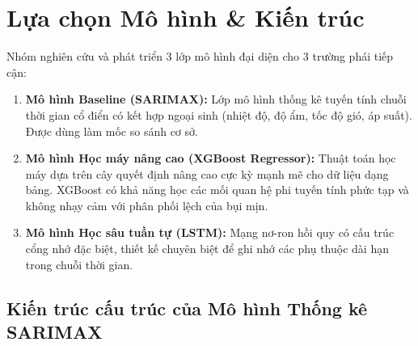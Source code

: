 \documentclass[12pt,a4paper]{article}
\begin{document}
\section{Lựa chọn Mô hình \& Kiến trúc}

Nhóm nghiên cứu và phát triển 3 lớp mô hình đại diện cho 3 trường phái tiếp cận:

\begin{enumerate}
    \item \textbf{Mô hình Baseline (SARIMAX):} Lớp mô hình thống kê tuyến tính chuỗi thời gian cổ điển có kết hợp ngoại sinh (nhiệt độ, độ ẩm, tốc độ gió, áp suất). Được dùng làm mốc so sánh cơ sở.
    \item \textbf{Mô hình Học máy nâng cao (XGBoost Regressor):} Thuật toán học máy dựa trên cây quyết định nâng cao cực kỳ mạnh mẽ cho dữ liệu dạng bảng. XGBoost có khả năng học các mối quan hệ phi tuyến tính phức tạp và không nhạy cảm với phân phối lệch của bụi mịn.
    \item \textbf{Mô hình Học sâu tuần tự (LSTM):} Mạng nơ-ron hồi quy có cấu trúc cổng nhớ đặc biệt, thiết kế chuyên biệt để ghi nhớ các phụ thuộc dài hạn trong chuỗi thời gian.
\end{enumerate}

\subsection{Kiến trúc cấu trúc của Mô hình Thống kê SARIMAX}
\end{document}
